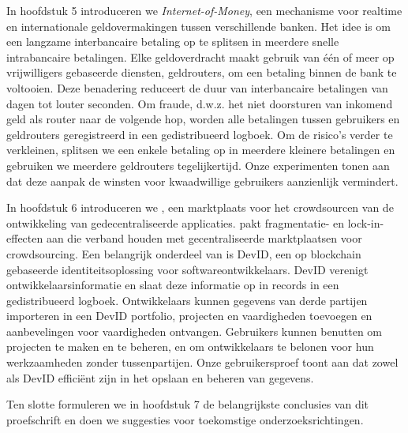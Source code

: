 {In hoofdstuk 5 introduceren we \emph{Internet-of-Money}, een mechanisme voor realtime en internationale geldovermakingen tussen verschillende banken.
Het idee is om een ​​langzame interbancaire betaling op te splitsen in meerdere snelle intrabancaire betalingen.
Elke geldoverdracht maakt gebruik van één of meer op vrijwilligers gebaseerde diensten, geldrouters, om een ​​betaling binnen de bank te voltooien.
Deze benadering reduceert de duur van interbancaire betalingen van dagen tot louter seconden.
Om fraude, d.w.z. het niet doorsturen van inkomend geld als router naar de volgende hop, worden alle betalingen tussen gebruikers en geldrouters geregistreerd in een gedistribueerd logboek.
Om de risico's verder te verkleinen, splitsen we een enkele betaling op in meerdere kleinere betalingen en gebruiken we meerdere geldrouters tegelijkertijd.
Onze experimenten tonen aan dat deze aanpak de winsten voor kwaadwillige gebruikers aanzienlijk vermindert.

In hoofdstuk 6 introduceren we \emph{\Dappcoder{}}, een marktplaats voor het crowdsourcen van de ontwikkeling van gedecentraliseerde applicaties.
\Dappcoder{} pakt fragmentatie- en lock-in-effecten aan die verband houden met gecentraliseerde marktplaatsen voor crowdsourcing.
Een belangrijk onderdeel van \Dappcoder{} is DevID, een op blockchain gebaseerde identiteitsoplossing voor softwareontwikkelaars.
DevID verenigt ontwikkelaarsinformatie en slaat deze informatie op in records in een gedistribueerd logboek.
Ontwikkelaars kunnen gegevens van derde partijen importeren in een DevID portfolio, projecten en vaardigheden toevoegen en aanbevelingen voor vaardigheden ontvangen.
Gebruikers kunnen \Dappcoder{} benutten om projecten te maken en te beheren, en om ontwikkelaars te belonen voor hun werkzaamheden zonder tussenpartijen.
Onze gebruikersproef toont aan dat zowel \Dappcoder{} als DevID efficiënt zijn in het opslaan en beheren van gegevens.

Ten slotte formuleren we in hoofdstuk 7 de belangrijkste conclusies van dit proefschrift en doen we suggesties voor toekomstige onderzoeksrichtingen.
}



